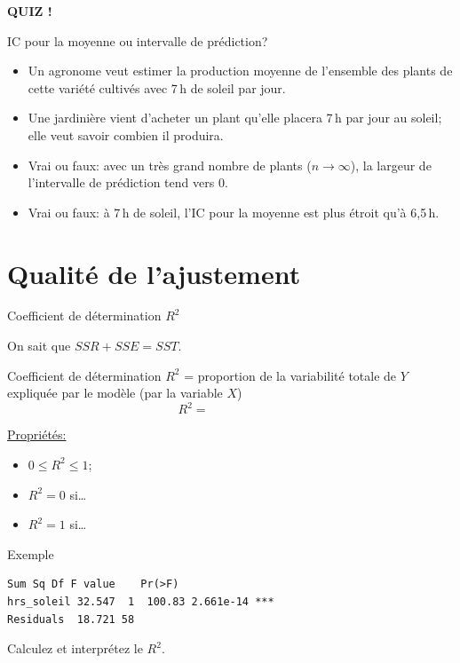\documentclass{BeamerTemplate}
\begin{document}
\begin{frame}[plain,t]
  \centerline{\LARGE\bfseries\alert{QUIZ !}}

  \medskip
  IC pour la moyenne ou intervalle de prédiction?
  \begin{itemize}\itemsep 1cm
    \item Un agronome veut estimer la production moyenne de \alert{l'ensemble} des
    plants de cette variété cultivés avec 7\,h de soleil par jour.
    \item<2-> Une jardinière vient d'acheter \alert{un} plant qu'elle placera 7\,h par
    jour au soleil; elle veut savoir combien il produira.
    \item<3-> Vrai ou faux: avec un très grand nombre de plants ($n\to\infty$), la
    largeur de l'intervalle de prédiction tend vers 0.
    \item<4-> Vrai ou faux: à 7\,h de soleil, l'IC pour la moyenne est plus étroit
    qu'à 6,5\,h.
  \end{itemize}
\end{frame}

\section{Qualité de l'ajustement}

\begin{frame}[t]{Coefficient de détermination $R^2$}

On sait que $SSR+SSE=SST$.

\begin{Boite}{Coefficient de détermination}
$R^2$ = proportion de la variabilité totale de $Y$ expliquée par le modèle
(par la variable $X$)
\[
R^2 = \qquad\qquad\qquad
\]
\end{Boite}

\underline{Propriétés:}
\begin{itemize}\itemsep3mm
  \item $0\le R^2\le1$;
  \item $R^2=0$ si\ldots
  \item $R^2=1$ si\ldots
\end{itemize}

\end{frame}

\begin{frame}[fragile,t]{Exemple}

\begin{Verbatim}[fontsize=\small]
           Sum Sq Df F value    Pr(>F)
hrs_soleil 32.547  1  100.83 2.661e-14 ***
Residuals  18.721 58
\end{Verbatim}

Calculez et interprétez le $R^2$.
\vspace{4cm}

\end{frame}
\end{document}
